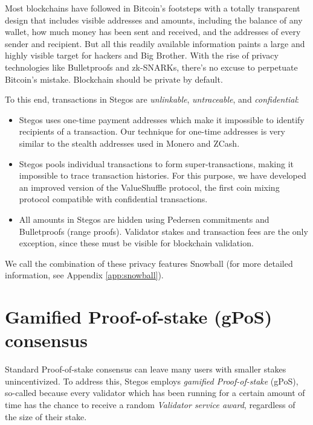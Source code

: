 \documentclass[8pt,fleqn,openany]{book}
\begin{document}
	Most blockchains have followed in Bitcoin’s footsteps with a totally transparent design that includes visible addresses and amounts, including the balance of any wallet, how much money has been sent and received, and the addresses of every sender and recipient. But all this readily available information paints a large and highly visible target for hackers and Big Brother. With the rise of privacy technologies like Bulletproofs and zk-SNARKs, there’s no excuse to perpetuate Bitcoin’s mistake. Blockchain should be private by default.
	
	To this end, transactions in Stegos are \textit{unlinkable}, \textit{untraceable}, and \textit{confidential}:
	
	\begin{itemize}
		\item Stegos uses one-time payment addresses which make it impossible to identify recipients of a transaction. Our technique for one-time addresses is very similar to the stealth addresses used in Monero and ZCash.
		\item Stegos pools individual transactions to form super-transactions, making it impossible to trace transaction histories. For this purpose, we have developed an improved version of the ValueShuffle protocol\cite{c7}, the first coin mixing protocol compatible with confidential transactions.
		\item All amounts in Stegos are hidden using Pedersen commitments\cite{c8} and Bulletproofs (range proofs)\cite{c4}. Validator stakes and transaction fees are the only exception, since these must be visible for blockchain validation.\end{itemize}
	
	We call the combination of these privacy features Snowball (for more detailed information, see Appendix \ref{app:snowball}). %
	
	\section{Gamified Proof-of-stake (gPoS) consensus}
	
	Standard Proof-of-stake consensus can leave many users with smaller stakes unincentivized. To address this, Stegos employs \textit{gamified Proof-of-stake} (gPoS), so-called because every validator which has been running for a certain amount of time has the chance to receive a random \textit{Validator service award}, regardless of the size of their stake\footnotemark.
	
\end{document}
